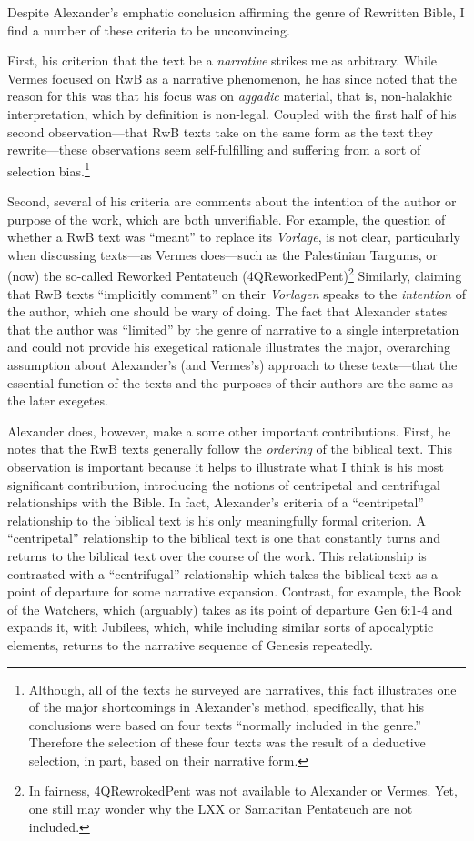 Despite Alexander's emphatic conclusion affirming the genre of
Rewritten Bible, I find a number of these criteria to be unconvincing.

First, his criterion that the text be a \emph{narrative} strikes me as
arbitrary. While Vermes focused on RwB as a narrative phenomenon, he has
since noted that the reason for this was that his focus was on
\emph{aggadic} material, that is, non-halakhic interpretation, which by
definition is non-legal. Coupled with the first half of his second
observation---that RwB texts take on the same form as the text they
rewrite---these observations seem self-fulfilling and suffering from a
sort of selection bias.\footnote{Although, all of the texts he surveyed
  are narratives, this fact illustrates one of the major shortcomings in
  Alexander's method, specifically, that his conclusions were based on
  four texts ``normally included in the
  genre.''\autocite[99]{alexander_carson-williamson1988} Therefore the
  selection of these four texts was the result of a deductive selection,
  in part, based on their narrative form.}

Second, several of his criteria are comments about the intention of the
author or purpose of the work, which are both unverifiable. For example,
the question of whether a RwB text was ``meant'' to replace its
\emph{Vorlage}, is not clear, particularly when discussing texts---as
Vermes does---such as the Palestinian Targums, or (now) the so-called
Reworked Pentateuch (4QReworkedPent)\footnote{In fairness,
  4QRewrokedPent was not available to Alexander or Vermes. Yet, one
  still may wonder why the LXX or Samaritan Pentateuch are not included.}
Similarly, claiming that RwB texts ``implicitly comment'' on their
\emph{Vorlagen} speaks to the \emph{intention} of the author, which one
should be wary of doing. The fact that Alexander states that the author
was ``limited'' by the genre of narrative to a single interpretation and
could not provide his exegetical rationale illustrates the major,
overarching assumption about Alexander's (and Vermes's) approach to
these texts---that the essential function of the texts and the purposes
of their authors are the same as the later exegetes.

Alexander does, however, make a some other important contributions.
First, he notes that the RwB texts generally follow the \emph{ordering}
of the biblical text. This observation is important because it helps to
illustrate what I think is his most significant contribution,
introducing the notions of centripetal and centrifugal relationships
with the Bible. In fact, Alexander's criteria of a ``centripetal''
relationship to the biblical text is his only meaningfully formal
criterion. A ``centripetal'' relationship to the biblical text is one
that constantly turns and returns to the biblical text over the course
of the work. This relationship is contrasted with a ``centrifugal''
relationship which takes the biblical text as a point of departure for
some narrative expansion. Contrast, for example, the Book of the
Watchers, which (arguably) takes as its point of departure Gen 6:1-4 and
expands it, with Jubilees, which, while including similar sorts of
apocalyptic elements, returns to the narrative sequence of Genesis
repeatedly.

